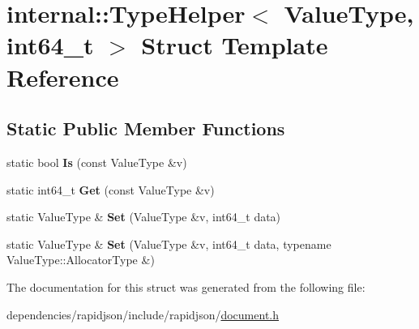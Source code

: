 \hypertarget{structinternal_1_1_type_helper_3_01_value_type_00_01int64__t_01_4}{}\section{internal\+:\+:Type\+Helper$<$ Value\+Type, int64\+\_\+t $>$ Struct Template Reference}
\label{structinternal_1_1_type_helper_3_01_value_type_00_01int64__t_01_4}
\subsection*{Static Public Member Functions}
\begin{DoxyCompactItemize}
\item 
\mbox{\label{structinternal_1_1_type_helper_3_01_value_type_00_01int64__t_01_4_a43c171bfbe873941a1b2be698a95de74}} 
static bool {\bfseries Is} (const Value\+Type \&v)
\item 
\mbox{\label{structinternal_1_1_type_helper_3_01_value_type_00_01int64__t_01_4_abe3368c8817cafe420a8b3f7d6ec1759}} 
static int64\+\_\+t {\bfseries Get} (const Value\+Type \&v)
\item 
\mbox{\label{structinternal_1_1_type_helper_3_01_value_type_00_01int64__t_01_4_a0c7b71569c12346902a396111782b12b}} 
static Value\+Type \& {\bfseries Set} (Value\+Type \&v, int64\+\_\+t data)
\item 
\mbox{\label{structinternal_1_1_type_helper_3_01_value_type_00_01int64__t_01_4_a85471fa774b4a8f4f56c191694a7f278}} 
static Value\+Type \& {\bfseries Set} (Value\+Type \&v, int64\+\_\+t data, typename Value\+Type\+::\+Allocator\+Type \&)
\end{DoxyCompactItemize}


The documentation for this struct was generated from the following file\+:\begin{DoxyCompactItemize}
\item 
dependencies/rapidjson/include/rapidjson/\hyperlink{document_8h}{document.\+h}\end{DoxyCompactItemize}
